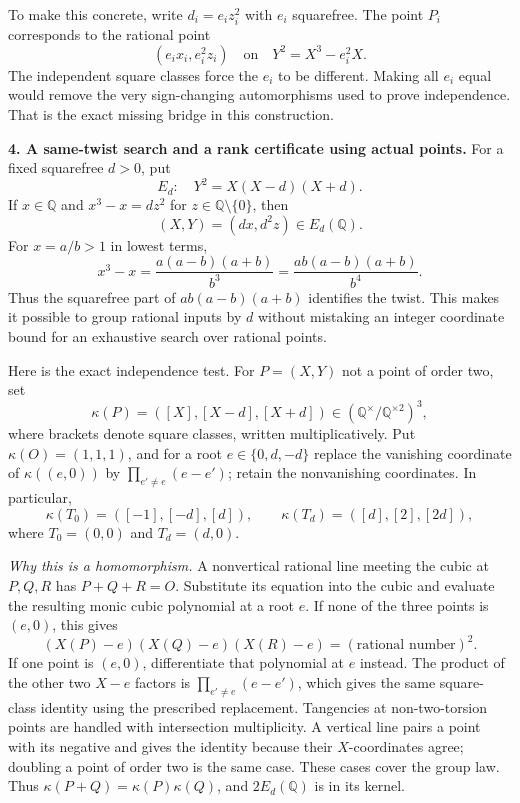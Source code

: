 \documentclass[11pt,a4paper]{article}
\newcommand{\Q}{\mathbb{Q}}
\numberwithin{equation}{section}
\begin{document}
To make this concrete, write $d_i=e_i z_i^2$ with $e_i$ squarefree.
The point $P_i$ corresponds to the rational point
\[
 (e_ix_i,e_i^2z_i)\quad\text{on}\quad
 Y^2=X^3-e_i^2X.
\]
The independent square classes force the $e_i$ to be different. Making all
$e_i$ equal would remove the very sign-changing automorphisms used to prove
independence. That is the exact missing bridge in this construction.

\medskip
\textbf{4. A same-twist search and a rank certificate using actual points.}
For a fixed squarefree $d>0$, put
\[
 E_d:\quad Y^2=X(X-d)(X+d).
\]
If $x\in\Q$ and $x^3-x=dz^2$ for $z\in\Q\setminus\{0\}$, then
\begin{equation}\label{statement:point}
 (X,Y)=(dx,d^2z)\in E_d(\Q).
\end{equation}
For $x=a/b>1$ in lowest terms,
\[
 x^3-x=\frac{a(a-b)(a+b)}{b^3}
       =\frac{ab(a-b)(a+b)}{b^4}.
\]
Thus the squarefree part of $ab(a-b)(a+b)$ identifies the twist. This makes
it possible to group rational inputs by $d$ without mistaking an integer
coordinate bound for an exhaustive search over rational points.

Here is the exact independence test. For $P=(X,Y)$ not a point of order two,
set
\[
 \kappa(P)=([X],[X-d],[X+d])
 \in(\Q^\times/\Q^{\times2})^3,
\]
where brackets denote square classes, written multiplicatively. Put
$\kappa(O)=(1,1,1)$, and for a root $e\in\{0,d,-d\}$ replace the vanishing
coordinate of $\kappa((e,0))$ by
$\prod_{e'\neq e}(e-e')$; retain the nonvanishing coordinates. In particular,
\begin{equation}\label{statement:torsion}
 \kappa(T_0)=([-1],[-d],[d]),\qquad
 \kappa(T_d)=([d],[2],[2d]),
\end{equation}
where $T_0=(0,0)$ and $T_d=(d,0)$.

\emph{Why this is a homomorphism.} A nonvertical rational line meeting the
cubic at $P,Q,R$ has $P+Q+R=O$. Substitute its equation into the cubic and
evaluate the resulting monic cubic polynomial at a root $e$. If none of
the three points is $(e,0)$, this gives
\[
 (X(P)-e)(X(Q)-e)(X(R)-e)=(\text{rational number})^2.
\]
If one point is $(e,0)$, differentiate that polynomial at $e$ instead. The
product of the other two $X-e$ factors is
$\prod_{e'\neq e}(e-e')$, which gives the same square-class identity using
the prescribed replacement. Tangencies at non-two-torsion points are handled
with intersection multiplicity. A vertical line pairs a point with its
negative and gives the identity because their $X$-coordinates agree; doubling
a point of order two is the same case. These cases cover the group law.
Thus $\kappa(P+Q)=\kappa(P)\kappa(Q)$, and $2E_d(\Q)$ is in its kernel.
\end{document}
